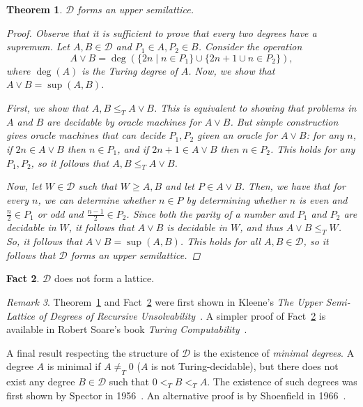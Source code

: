 \documentclass[psamsfonts]{amsart}
\newtheorem{thm}{Theorem}[section]
\theoremstyle{definition}
\newtheorem{fact}[thm]{Fact}
\theoremstyle{remark}
\newtheorem{rem}[thm]{Remark}
\numberwithin{equation}{section}
\begin{document}
\begin{thm}
  \label{thm:up_sem}
  $\mathcal{D}$ forms an upper semilattice.
    \begin{proof}
    Observe that it is sufficient to prove that every two degrees have a
    supremum. Let $A,B\in \mathcal{D}$ and  $P_1\in A, P_2 \in B$. Consider the operation
    \[
      A\vee B = \deg\left( \{2n \mid n \in P_1\}\cup\{2n+1\cup n\in P_2\} \right),
    \]
    where $\deg(A)$ is the Turing degree of $A$. Now, we show that $A\vee B = \sup(A,B)$.\par First, we show that
    $A,B \leq_T A \vee B$. This is equivalent to showing
    that problems in $A$ and $B$ are decidable by oracle machines for $A\vee
    B$. But simple construction gives oracle machines that can decide $P_1,P_2$
    given an oracle for $A\vee B$: for any $n$, if $2n\in A\vee B$ then
    $n\in P_1$, and if $2n+1\in A\vee B$ then $n\in P_2$. This holds for any
    $P_1,P_2$, so it follows that $A,B \leq_T A \vee
    B$. \par Now, let $W\in \mathcal{D}$ such that $W \geq
    A,B$ and let $P\in A\vee B$. Then, we have that for every $n$, we can
    determine whether $n\in P$ by determining whether $n$ is even and
    $\frac{n}{2}\in P_1$ or odd and $\frac{n-1}{2}\in P_2$. Since both the parity
    of a number and $P_1$ and $P_2$ are decidable in $W$, it follows that
    $A\vee B$ is decidable in $W$, and thus $A\vee B \leq_T W$. So, it follows
    that $A\vee B = \sup(A,B)$. This holds for all $A,B\in\mathcal{D}$, so it
    follows that $\mathcal{D}$ forms an upper semilattice.  
  \end{proof}
\end{thm}

\begin{fact}
  \label{fact:not_lat}
  $ \mathcal{D}$ does not form a lattice.
\end{fact}
\begin{rem}
Theorem~\ref{thm:up_sem} and Fact~\ref{fact:not_lat} were first shown in
Kleene's \emph{The Upper Semi-Lattice of Degrees of Recursive
  Unsolvability}~\cite{kleene54_upper_semi_lattic_degrees_recur_unsol}. A simpler proof
of Fact~\ref{fact:not_lat} is available in Robert Soare's book \emph{Turing Computability}~\cite[pp.~142--144]{soare16_turin_comput}.
\end{rem}
 A final result respecting the structure of $\mathcal{D}$ is the existence of
 \emph{minimal degrees}. A degree $A$ is minimal if $A \neq_T 0$ ($A$ is not
 Turing-decidable), but there does not exist any degree $B\in \mathcal{D}$ such
 that $0 <_T B <_T A$. The existence of such degrees was first shown by Spector
 in 1956~\cite{spector56_degrees_recur_unsol}. An alternative proof is by
 Shoenfield in 1966~\cite{shoenfield66_theor_minim_degrees}.
\end{document}
